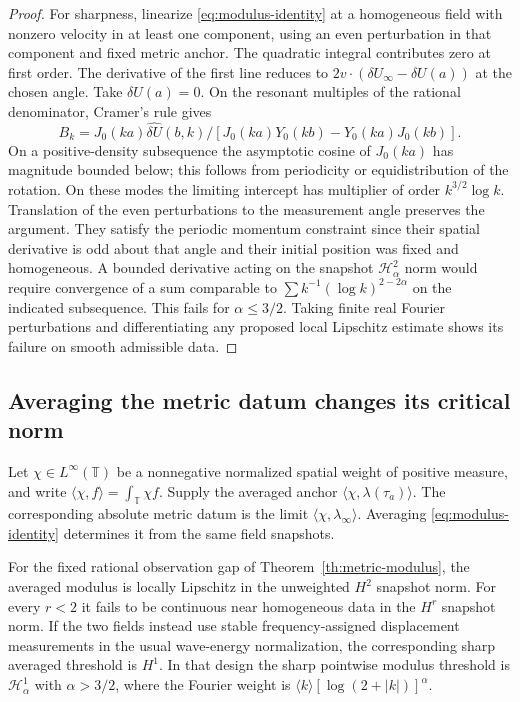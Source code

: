 \begin{proof}
For sharpness, linearize \eqref{eq:modulus-identity}
at a homogeneous field with nonzero velocity in at
least one component, using an even perturbation in
that component and fixed metric anchor.
The quadratic integral contributes zero at first order.
The derivative of the first line reduces to
$2v\cdot(\delta U_\infty-\delta U(a))$ at the chosen
angle. Take $\delta U(a)=0$.
On the resonant multiples of the rational
denominator, Cramer's rule gives
\[
 B_k=J_0(ka)\widehat{\delta U}(b,k)/
       [J_0(ka)Y_0(kb)-Y_0(ka)J_0(kb)] .
\]
On a positive-density subsequence the asymptotic cosine
of $J_0(ka)$ has magnitude bounded below;
this follows from periodicity or equidistribution
of the rotation. On these modes the limiting
intercept has multiplier of order $k^{3/2}\log k$.
Translation of the even perturbations to the
measurement angle preserves the argument.
They satisfy the periodic momentum constraint since
their spatial derivative is odd about that angle
and their initial position was fixed and homogeneous.
A bounded derivative acting on the snapshot
$\mathcal H^2_\alpha$ norm would require convergence
of a sum comparable to
$\sum k^{-1}(\log k)^{2-2\alpha}$ on the indicated
subsequence. This fails for $\alpha\le3/2$.
Taking finite real Fourier perturbations and
differentiating any proposed local Lipschitz estimate
shows its failure on smooth admissible data.
\end{proof}

\subsection{Averaging the metric datum changes its critical norm}
\label{sec:modulus-aperture}

Let $\chi\in L^\infty(\mathbb T)$ be a nonnegative
normalized spatial weight of positive measure, and
write $\langle\chi,f\rangle=\int_{\mathbb T}\chi f$.
Supply the averaged anchor $\langle\chi,\lambda(\tau_a)\rangle$.
The corresponding absolute metric datum is the limit
$\langle\chi,\lambda_\infty\rangle$.
Averaging \eqref{eq:modulus-identity} determines it
from the same field snapshots.

\begin{proposition}
\label{prop:averaged-modulus}
For the fixed rational observation gap of
Theorem~\ref{th:metric-modulus}, the averaged modulus
is locally Lipschitz in the unweighted $H^2$ snapshot
norm. For every $r<2$ it fails to be continuous
near homogeneous data in the $H^r$ snapshot norm.
If the two fields instead use stable frequency-assigned
displacement measurements in the usual wave-energy
normalization, the corresponding sharp averaged
threshold is $H^1$. In that design the sharp
pointwise modulus threshold is
$\mathcal H^1_\alpha$ with $\alpha>3/2$,
where the Fourier weight is
$\langle k\rangle[\log(2+|k|)]^\alpha$.
\end{proposition}

